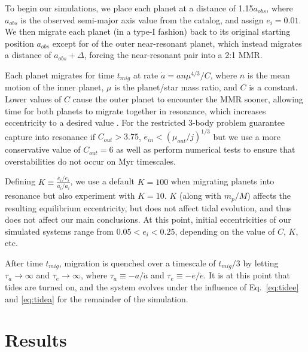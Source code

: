 To begin our simulations, we place each planet at a distance of 1.15$a_{obs}$, where $a_{obs}$ is the observed semi-major axis value from the \kep{} catalog, and assign $e_i = 0.01$. 
We then migrate each planet (in a type-I fashion) back to its original starting position $a_{obs}$ except for of the outer near-resonant planet, which instead migrates a distance of $a_{obs} + \Delta$, forcing the near-resonant pair into a 2:1 MMR.

Each planet migrates for time $t_{mig}$ at rate $\dot{a} = an\mu^{4/3}/C$, where $n$ is the mean motion of the inner planet, $\mu$ is the planet/star mass ratio, and $C$ is a constant. 
Lower values of $C$ cause the outer planet to encounter the MMR sooner, allowing time for both planets to migrate together in resonance, which increases eccentricity to a desired value \citep{Lee2002}. 
For the restricted 3-body problem \citet{Goldreich2014} guarantee capture into resonance if $C_{out} > 3.75$, $e_{in} < (\mu_{out}/j)^{1/3}$ but we use a more conservative value of $C_{out} = 6$ as well as perform numerical tests to ensure that overstabilities do not occur on Myr timescales. 

Defining $K \equiv \frac{\dot{e_i}/e_i}{\dot{a_i}/a_i}$, we use a default $K = 100$ when migrating planets into resonance but also experiment with $K = 10$. 
$K$ (along with $m_p/M$) affects the resulting equilibrium eccentricity, but does not affect tidal evolution, and thus does not affect our main conclusions. 
At this point, initial eccentricities of our simulated \kep{} systems range from $0.05 < e_i < 0.25$, depending on the value of $C$, $K$, etc.

After time $t_{mig}$, migration is quenched over a timescale of $t_{mig}/3$ by letting $\tau_a \rightarrow \infty$ and $\tau_e \rightarrow \infty$, where $\tau_a \equiv - a/\dot{a}$ and $\tau_e \equiv - e/\dot{e}$.
It is at this point that tides are turned on, and the system evolves under the influence of Eq.~\ref{eq:tidee} and \ref{eq:tidea} for the remainder of the simulation. 

\section{Results}
\label{sec:results}
